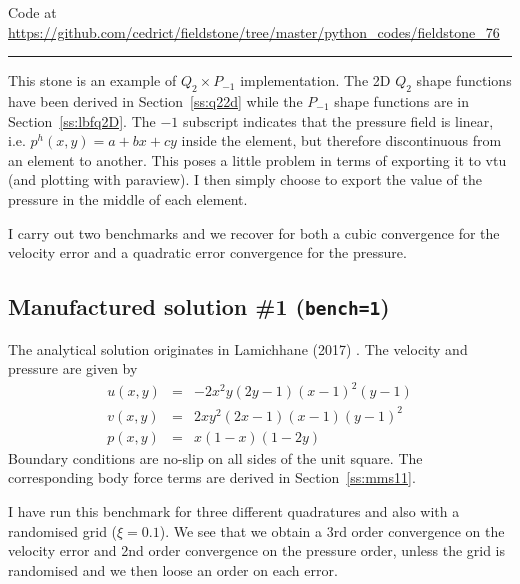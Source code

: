 

\begin{center}
Code at \url{https://github.com/cedrict/fieldstone/tree/master/python_codes/fieldstone_76}
\end{center}

\par\noindent\rule{\textwidth}{0.4pt}



This stone is an example of $Q_2\times P_{-1}$ implementation. 
The 2D $Q_2$ shape functions have been derived in Section~\ref{ss:q22d}
while the $P_{-1}$ shape functions are in Section~\ref{ss:lbfq2D}.
The $-1$ subscript indicates that the pressure field is linear, 
i.e. $p^h(x,y)=a+bx+cy$ inside the element, but therefore discontinuous 
from an element to another. 
This poses a little problem in terms of exporting it to vtu (and plotting with paraview).
I then simply choose to export the value of the pressure in the middle of 
each element. 

I carry out two benchmarks and we recover for both a cubic convergence 
for the velocity error and a quadratic error convergence for the pressure.

\subsection*{Manufactured solution \#1 ({\tt bench=1})}

The analytical solution originates in Lamichhane (2017) \cite{lami17}.
The velocity and pressure are given by
\begin{eqnarray}
u(x,y)&=&-2x^2y(2y-1)(x-1)^2(y-1) \\
v(x,y)&=& 2xy^2(2x-1)(x-1)(y-1)^2 \\
p(x,y)&=& x(1-x)(1-2y)
\end{eqnarray}
Boundary conditions are no-slip on all sides of the unit square. 
The corresponding body force terms are derived in Section~\ref{ss:mms11}. 

I have run this benchmark for three different quadratures and also with a 
randomised grid ($\xi=0.1$). We see that we obtain a 3rd order convergence 
on the velocity error and 2nd order convergence on the pressure order, 
unless the grid is randomised and we then loose an order on each error.

